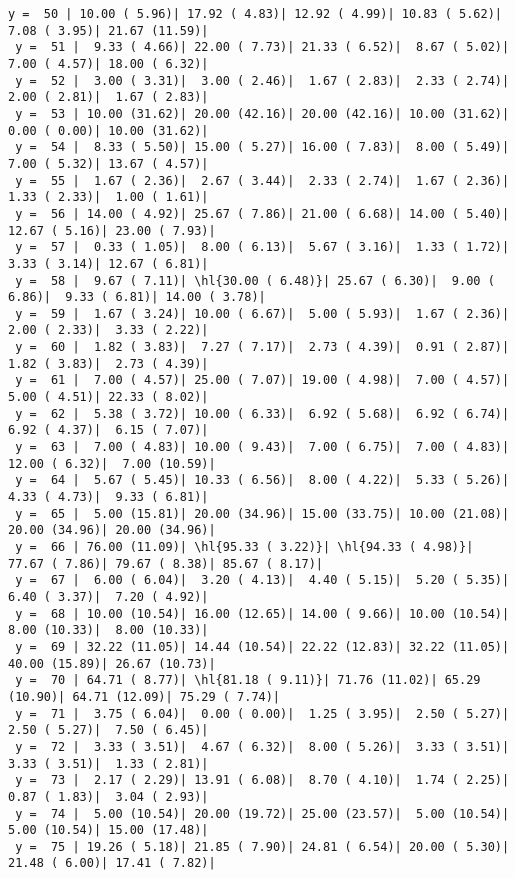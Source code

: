 \documentclass[10pt]{article}
\newcommand{\hl}[1]{\textcolor{blue}{#1}}
\begin{document}
\begin{Verbatim}[fontsize=\small, commandchars=\\\{\}]
 y =  50 | 10.00 ( 5.96)| 17.92 ( 4.83)| 12.92 ( 4.99)| 10.83 ( 5.62)|  7.08 ( 3.95)| 21.67 (11.59)|
 y =  51 |  9.33 ( 4.66)| 22.00 ( 7.73)| 21.33 ( 6.52)|  8.67 ( 5.02)|  7.00 ( 4.57)| 18.00 ( 6.32)|
 y =  52 |  3.00 ( 3.31)|  3.00 ( 2.46)|  1.67 ( 2.83)|  2.33 ( 2.74)|  2.00 ( 2.81)|  1.67 ( 2.83)|
 y =  53 | 10.00 (31.62)| 20.00 (42.16)| 20.00 (42.16)| 10.00 (31.62)|  0.00 ( 0.00)| 10.00 (31.62)|
 y =  54 |  8.33 ( 5.50)| 15.00 ( 5.27)| 16.00 ( 7.83)|  8.00 ( 5.49)|  7.00 ( 5.32)| 13.67 ( 4.57)|
 y =  55 |  1.67 ( 2.36)|  2.67 ( 3.44)|  2.33 ( 2.74)|  1.67 ( 2.36)|  1.33 ( 2.33)|  1.00 ( 1.61)|
 y =  56 | 14.00 ( 4.92)| 25.67 ( 7.86)| 21.00 ( 6.68)| 14.00 ( 5.40)| 12.67 ( 5.16)| 23.00 ( 7.93)|
 y =  57 |  0.33 ( 1.05)|  8.00 ( 6.13)|  5.67 ( 3.16)|  1.33 ( 1.72)|  3.33 ( 3.14)| 12.67 ( 6.81)|
 y =  58 |  9.67 ( 7.11)| \hl{30.00 ( 6.48)}| 25.67 ( 6.30)|  9.00 ( 6.86)|  9.33 ( 6.81)| 14.00 ( 3.78)|
 y =  59 |  1.67 ( 3.24)| 10.00 ( 6.67)|  5.00 ( 5.93)|  1.67 ( 2.36)|  2.00 ( 2.33)|  3.33 ( 2.22)|
 y =  60 |  1.82 ( 3.83)|  7.27 ( 7.17)|  2.73 ( 4.39)|  0.91 ( 2.87)|  1.82 ( 3.83)|  2.73 ( 4.39)|
 y =  61 |  7.00 ( 4.57)| 25.00 ( 7.07)| 19.00 ( 4.98)|  7.00 ( 4.57)|  5.00 ( 4.51)| 22.33 ( 8.02)|
 y =  62 |  5.38 ( 3.72)| 10.00 ( 6.33)|  6.92 ( 5.68)|  6.92 ( 6.74)|  6.92 ( 4.37)|  6.15 ( 7.07)|
 y =  63 |  7.00 ( 4.83)| 10.00 ( 9.43)|  7.00 ( 6.75)|  7.00 ( 4.83)| 12.00 ( 6.32)|  7.00 (10.59)|
 y =  64 |  5.67 ( 5.45)| 10.33 ( 6.56)|  8.00 ( 4.22)|  5.33 ( 5.26)|  4.33 ( 4.73)|  9.33 ( 6.81)|
 y =  65 |  5.00 (15.81)| 20.00 (34.96)| 15.00 (33.75)| 10.00 (21.08)| 20.00 (34.96)| 20.00 (34.96)|
 y =  66 | 76.00 (11.09)| \hl{95.33 ( 3.22)}| \hl{94.33 ( 4.98)}| 77.67 ( 7.86)| 79.67 ( 8.38)| 85.67 ( 8.17)|
 y =  67 |  6.00 ( 6.04)|  3.20 ( 4.13)|  4.40 ( 5.15)|  5.20 ( 5.35)|  6.40 ( 3.37)|  7.20 ( 4.92)|
 y =  68 | 10.00 (10.54)| 16.00 (12.65)| 14.00 ( 9.66)| 10.00 (10.54)|  8.00 (10.33)|  8.00 (10.33)|
 y =  69 | 32.22 (11.05)| 14.44 (10.54)| 22.22 (12.83)| 32.22 (11.05)| 40.00 (15.89)| 26.67 (10.73)|
 y =  70 | 64.71 ( 8.77)| \hl{81.18 ( 9.11)}| 71.76 (11.02)| 65.29 (10.90)| 64.71 (12.09)| 75.29 ( 7.74)|
 y =  71 |  3.75 ( 6.04)|  0.00 ( 0.00)|  1.25 ( 3.95)|  2.50 ( 5.27)|  2.50 ( 5.27)|  7.50 ( 6.45)|
 y =  72 |  3.33 ( 3.51)|  4.67 ( 6.32)|  8.00 ( 5.26)|  3.33 ( 3.51)|  3.33 ( 3.51)|  1.33 ( 2.81)|
 y =  73 |  2.17 ( 2.29)| 13.91 ( 6.08)|  8.70 ( 4.10)|  1.74 ( 2.25)|  0.87 ( 1.83)|  3.04 ( 2.93)|
 y =  74 |  5.00 (10.54)| 20.00 (19.72)| 25.00 (23.57)|  5.00 (10.54)|  5.00 (10.54)| 15.00 (17.48)|
 y =  75 | 19.26 ( 5.18)| 21.85 ( 7.90)| 24.81 ( 6.54)| 20.00 ( 5.30)| 21.48 ( 6.00)| 17.41 ( 7.82)|

\end{Verbatim}
\end{document}

